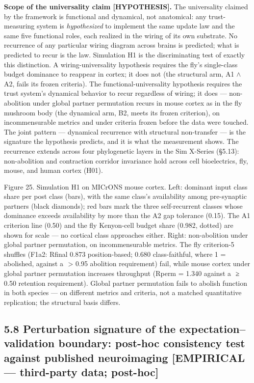 \documentclass[
]{article}
\begin{document}
\textbf{Scope of the universality claim {[}HYPOTHESIS{]}.} The
universality claimed by the framework is functional and dynamical, not
anatomical: any trust-measuring system is \emph{hypothesized} to
implement the same update law and the same five functional roles, each
realized in the wiring of its own substrate. No recurrence of any
particular wiring diagram across brains is predicted; what is predicted
to recur is the law. Simulation H1 is the discriminating test of exactly
this distinction. A wiring-universality hypothesis requires the fly's
single-class budget dominance to reappear in cortex; it does not (the
structural arm, A1 \(\wedge\) A2, fails its frozen criteria). The
functional-universality hypothesis requires the trust system's dynamical
behavior to recur regardless of wiring; it does --- non-abolition under
global partner permutation recurs in mouse cortex as in the fly mushroom
body (the dynamical arm, B2, meets its frozen criterion), on
incommensurable metrics and under criteria frozen before the data were
touched. The joint pattern --- dynamical recurrence with structural
non-transfer --- is the signature the hypothesis predicts, and it is
what the measurement shows. The recurrence extends across four
phylogenetic layers in the Sim X-Series (§5.13): non-abolition and
contraction corridor invariance hold across cell bioelectrics, fly,
mouse, and human cortex (H01).

Figure 25. Simulation H1 on MICrONS mouse cortex. Left: dominant input
class share per post class (bars), with the same class's availability
among pre-synaptic partners (black diamonds); red bars mark the three
self-recurrent classes whose dominance exceeds availability by more than
the A2 gap tolerance (0.15). The A1 criterion line (0.50) and the fly
Kenyon-cell budget share (0.982, dotted) are shown for scale --- no
cortical class approaches either. Right: non-abolition under global
partner permutation, on incommensurable metrics. The fly criterion-5
shuffles (F1a2: {Rfinal} 0.873 position-based; 0.680 class-faithful,
where 1 = abolished, against a { \textgreater{} 0.95} abolition
requirement) fail, while mouse cortex under global partner permutation
increases throughput ({Rperm = 1.340} against a { ≥ 0.50} retention
requirement). Global partner permutation fails to abolish function in
both species --- on different metrics and criteria, not a matched
quantitative replication; the structural basis differs.

\subsection{5.8 Perturbation signature of the expectation--validation
boundary: post-hoc consistency test against published neuroimaging
{[}EMPIRICAL --- third-party data;
post-hoc{]}}\label{perturbation-signature-of-the-expectationvalidation-boundary-post-hoc-consistency-test-against-published-neuroimaging-empirical-third-party-data-post-hoc}
\end{document}
